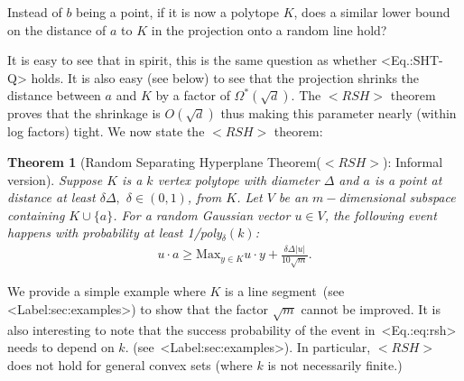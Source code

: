 \documentclass[11pt,letterpaper]{article}
\newcounter{note}[section]
\def\\{}%
\def\mathsf#1{<#1>}%
\def\xspace{}%
\def\Cref#1{<Label:#1>}%
\def\eqref#1{<Eq.:#1>}%
\newtheorem{theorem}{Theorem}[section]
\theoremstyle{definition}
\theoremstyle{remark}
\newcommand{\rsh}{{\mathsf {RSH}}\xspace}
\begin{document}
Instead of $b$ being a point, if it is now a polytope $K$, does a  similar lower bound on the distance of $a$ to $K$ in the projection onto a random line hold?  

It is easy to see that in spirit, this is the same question as whether \eqref{SHT-Q} holds.
It is also easy (see below) to see that the projection shrinks the distance between $a$ and $K$ by a factor of $\Omega^*(\sqrt d)$. 
The $\rsh$ theorem proves that the shrinkage is $O(\sqrt d)$ thus making this parameter nearly (within log factors) tight. We now state  the $\rsh$ theorem:
\begin{theorem}
[Random Separating Hyperplane Theorem($\rsh$): Informal version]  
\label{rsh-0} Suppose $K$ is a $k$ vertex polytope with diameter $\Delta$ and $a$ is a point at distance at least $\delta\Delta,$ $\delta\in (0,1)$, from 
$K$. Let $V$ be an $m-$dimensional subspace containing $K\cup \{ a\}$. For a random Gaussian vector $u\in V$, the following event happens with probability  at least 
1/poly$_\delta (k)$:
\begin{align}
\label{eq:rsh}
u\cdot a\geq \mbox{Max}_{y\in K}u\cdot y + \frac{\delta \Delta |u|}{10\sqrt m}.
\end{align}
\end{theorem}
We provide a simple example where $K$ is a line segment~(see \Cref{sec:examples}) to show that the factor $\sqrt m$ cannot be improved. It is also interesting to note that the success probability of the event in~\eqref{eq:rsh} needs to depend on $k$. 
(see~\Cref{sec:examples}).
In particular, $\rsh$ does not hold for general convex sets (where $k$ is not necessarily finite.) \\




\end{document}
